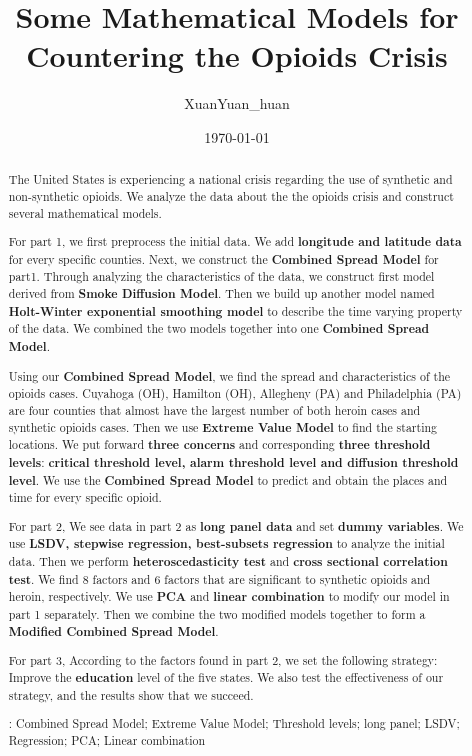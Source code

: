\documentclass{mcmthesis}
\title{\large \bf{Some Mathematical Models for Countering the Opioids Crisis}}
\author{XuanYuan\_huan}
\date{\today}
\numberwithin{equation}{section}
\numberwithin{figure}{section}
\numberwithin{table}{section}
\theoremstyle{mydef}
\begin{document}
\begin{abstract}

The United States is experiencing a national crisis regarding the use of synthetic and non-synthetic opioids. We analyze the data about the the opioids crisis and construct several mathematical models.

For part 1, we first preprocess the initial data. We add {\bf{longitude and latitude data}} for every specific counties. Next, we construct the {\bf{Combined Spread Model}} for part1. Through analyzing the characteristics of the data, we construct first model derived from {\bf{Smoke Diffusion Model}}. Then we build up another model named {\bf{Holt-Winter exponential smoothing model}} to describe the time varying property of the data. We combined the two models together into one {\bf{Combined Spread Model}}.

Using our {\bf{Combined Spread Model}}, we find the spread and characteristics of the opioids cases. Cuyahoga (OH), Hamilton (OH), Allegheny (PA) and Philadelphia (PA) are four counties that almost have the largest number of both heroin cases and synthetic opioids cases.  Then we use {\bf{Extreme Value Model}} to find the starting locations. We put forward {\bf{three concerns}} and corresponding {\bf{three threshold levels}}: {\bf{critical threshold level, alarm threshold level and diffusion threshold level}}. We use the {\bf{Combined Spread Model}} to predict and obtain the places and time for every specific opioid.

For part 2, We see data in part 2 as {\bf{long panel data}} and set {\bf{dummy variables}}. We use {\bf{LSDV, stepwise regression, best-subsets regression}} to analyze the initial data. Then we perform {\bf{heteroscedasticity  test}} and {\bf{cross sectional correlation test}}. We find 8 factors and 6 factors that are significant to synthetic opioids and heroin, respectively. We use {\bf{PCA}} and {\bf{linear combination}} to modify our model in part 1 separately. Then we combine the two modified models together to form a {\bf{Modified Combined Spread Model}}.

For part 3, According to the factors found in part 2, we set the following strategy: Improve the {\bf{education}} level of the five states. We also test the effectiveness of our strategy, and the results show that we succeed.

: Combined Spread Model; Extreme Value Model;  Threshold levels; long panel; LSDV; Regression; PCA; Linear combination
\end{abstract}
\end{document}

